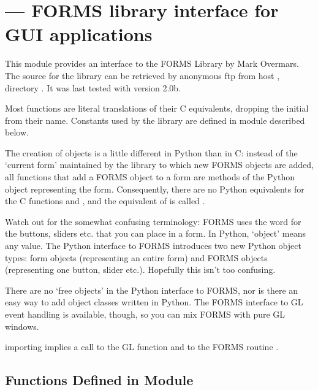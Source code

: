 \section{ ---
         FORMS library interface for GUI applications}



This module provides an interface to the FORMS Library by Mark Overmars.  The source for the
library can be retrieved by anonymous ftp from host
, directory .  It was last tested
with version 2.0b.

Most functions are literal translations of their C equivalents,
dropping the initial  from their name.  Constants used by
the library are defined in module 
described below.

The creation of objects is a little different in Python than in C:
instead of the `current form' maintained by the library to which new
FORMS objects are added, all functions that add a FORMS object to a
form are methods of the Python object representing the form.
Consequently, there are no Python equivalents for the C functions
 and , and the
equivalent of  is called
.

Watch out for the somewhat confusing terminology: FORMS uses the word
 for the buttons, sliders etc. that you can place in a form.
In Python, `object' means any value.  The Python interface to FORMS
introduces two new Python object types: form objects (representing an
entire form) and FORMS objects (representing one button, slider etc.).
Hopefully this isn't too confusing.

There are no `free objects' in the Python interface to FORMS, nor is
there an easy way to add object classes written in Python.  The FORMS
interface to GL event handling is available, though, so you can mix
FORMS with pure GL windows.

 importing  implies a call to the GL
function  and to the FORMS routine
.

\subsection{Functions Defined in Module }

